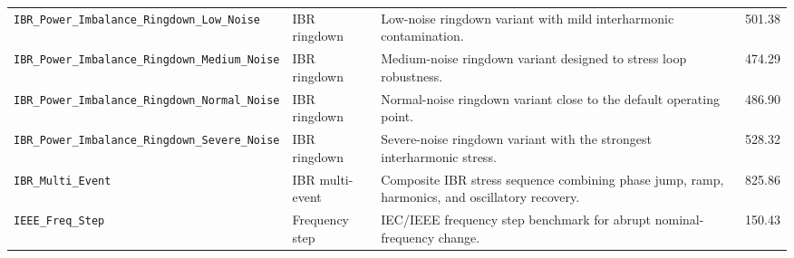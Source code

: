 \begin{longtable}{L{3.2cm} L{1.9cm} L{6.8cm} c}
\texttt{IBR\allowbreak\_Power\allowbreak\_Imbalance\allowbreak\_Ringdown\allowbreak\_Low\allowbreak\_Noise} & IBR ringdown & Low-noise ringdown variant with mild interharmonic contamination. & 501.38 \\
\texttt{IBR\allowbreak\_Power\allowbreak\_Imbalance\allowbreak\_Ringdown\allowbreak\_Medium\allowbreak\_Noise} & IBR ringdown & Medium-noise ringdown variant designed to stress loop robustness. & 474.29 \\
\texttt{IBR\allowbreak\_Power\allowbreak\_Imbalance\allowbreak\_Ringdown\allowbreak\_Normal\allowbreak\_Noise} & IBR ringdown & Normal-noise ringdown variant close to the default operating point. & 486.90 \\
\texttt{IBR\allowbreak\_Power\allowbreak\_Imbalance\allowbreak\_Ringdown\allowbreak\_Severe\allowbreak\_Noise} & IBR ringdown & Severe-noise ringdown variant with the strongest interharmonic stress. & 528.32 \\
\texttt{IBR\allowbreak\_Multi\allowbreak\_Event} & IBR multi-event & Composite IBR stress sequence combining phase jump, ramp, harmonics, and oscillatory recovery. & 825.86 \\
\texttt{IEEE\allowbreak\_Freq\allowbreak\_Step} & Frequency step & IEC/IEEE frequency step benchmark for abrupt nominal-frequency change. & 150.43 \\
\end{longtable}
